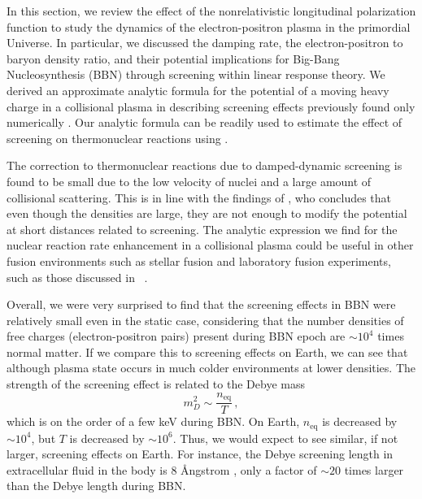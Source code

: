 In this section, we review the effect of  the nonrelativistic longitudinal polarization function to study the dynamics of the electron-positron plasma in the primordial Universe\cite{Grayson:2023flr}. In particular, we discussed the damping rate, the electron-positron to baryon density ratio, and their potential implications for Big-Bang Nucleosynthesis (BBN) through screening within linear response theory. We derived an approximate analytic formula for the potential of a moving heavy charge in a collisional plasma in  describing screening effects previously found only numerically \cite{Hwang:2021kno}. Our analytic formula can be readily used to estimate the effect of screening on thermonuclear reactions using . 

The correction to thermonuclear reactions due to damped-dynamic screening is found to be small due to the low velocity of nuclei and a large amount of collisional scattering. This is in line with the findings of \cite{Hwang:2021kno}, who concludes that even though the densities are large, they are not enough to modify the potential at short distances related to screening. The analytic expression we find for the nuclear reaction rate enhancement  in a collisional plasma could be useful in other fusion environments such as stellar fusion and laboratory fusion experiments, such as those discussed in ~\cite{Labaune:2013dla,Margarone:2022mdpi}.

Overall, we were very surprised to find that the screening effects in BBN were relatively small even in the static case, considering that the number densities of free charges (electron-positron pairs) present during BBN epoch are $\sim 10^4$ times normal matter. If we compare this to screening effects on Earth, we can see that although plasma state occurs in much colder environments at lower densities. The strength of the screening effect is related to the Debye mass
\begin{equation}
m_D^2 \sim \frac{n_\text{eq} }{T}\,,
\end{equation}
which is on the order of a few keV during BBN. On Earth, $n_\text{eq}$ is decreased by $\sim 10^4$, but $T$ is decreased by $\sim 10^6$. Thus, we would expect to see similar, if not larger, screening effects on Earth. For instance, the Debye screening length in extracellular fluid in the body is 8 \AA ngstrom \cite{Wennerstrom:2020}, only a factor of $\sim 20$ times larger than the Debye length during BBN. 


